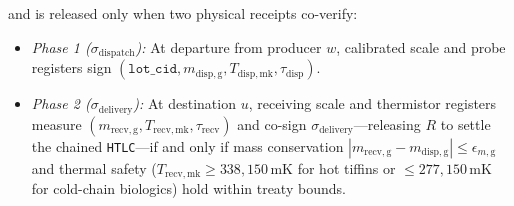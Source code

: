 \begin{enumerate}
    \parencite{camenisch2004signature,w3c2022vc,microchip_atecc608a} and is released only when
    two physical receipts co-verify:
    \begin{itemize}
        \item \emph{Phase 1 ($\sigma_{\mathrm{dispatch}}$):} At departure from producer $w$,
        calibrated scale and probe registers sign $(\texttt{lot\_cid}, m_{\mathrm{disp,g}},
        T_{\mathrm{disp,mk}}, \tau_{\mathrm{disp}})$.
        \item \emph{Phase 2 ($\sigma_{\mathrm{delivery}}$):} At destination $u$, receiving
        scale and thermistor registers measure $(m_{\mathrm{recv,g}}, T_{\mathrm{recv,mk}},
        \tau_{\mathrm{recv}})$ and co-sign $\sigma_{\mathrm{delivery}}$---releasing $R$ to
        settle the chained \texttt{HTLC}---if and only if mass conservation
        $|m_{\mathrm{recv,g}} - m_{\mathrm{disp,g}}| \le \epsilon_{m,\mathrm{g}}$ and thermal
        safety ($T_{\mathrm{recv,mk}} \ge 338{,}150\,\mathrm{mK}$ for hot tiffins or
        $\le 277{,}150\,\mathrm{mK}$ for cold-chain biologics) hold within treaty bounds.
    \end{itemize}
\end{enumerate}

